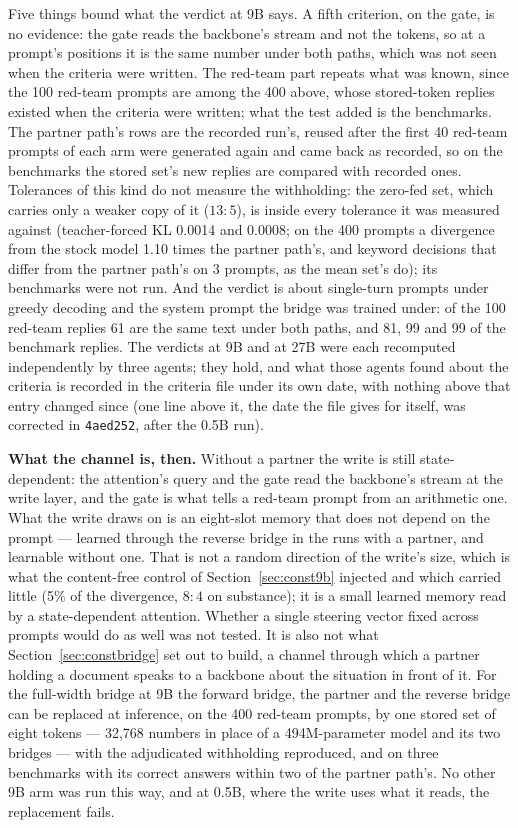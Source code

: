 \documentclass[11pt]{article}
\newcommand{\code}[1]{\texttt{#1}}
\begin{document}
Five things bound what the verdict at 9B says. A fifth criterion, on the gate, is
no evidence: the gate reads the backbone's stream and not the tokens, so at a
prompt's positions it is the same number under both paths, which was not seen when
the criteria were written. The red-team part repeats what was known, since the 100
red-team prompts are among the 400 above, whose stored-token replies existed when
the criteria were written; what the test added is the benchmarks. The partner
path's rows are the recorded run's, reused after the first 40 red-team prompts of
each arm were generated again and came back as recorded, so on the benchmarks the
stored set's new replies are compared with recorded ones. Tolerances of this kind
do not measure the withholding: the zero-fed set, which carries only a weaker copy
of it ($13{:}5$), is inside every tolerance it was measured against
(teacher-forced KL 0.0014 and 0.0008; on the 400 prompts a divergence from the
stock model 1.10 times the partner path's, and keyword decisions that differ from
the partner path's on 3 prompts, as the mean set's do); its benchmarks were not
run. And the verdict is about single-turn prompts under greedy decoding and the
system prompt the bridge was trained under: of the 100 red-team replies 61 are the
same text under both paths, and 81, 99 and 99 of the benchmark replies. The
verdicts at 9B and at 27B were each recomputed independently by three agents;
they hold, and what those agents found about the
criteria is recorded in the criteria file under its own date, with nothing above
that entry changed since (one line above it, the date the file gives for itself,
was corrected in \code{4aed252}, after the 0.5B run).

\textbf{What the channel is, then.} Without a partner the write is still
state-dependent: the attention's query and the gate read the backbone's stream at
the write layer, and the gate is what tells a red-team prompt from an arithmetic
one. What the write draws on is an eight-slot memory that does not depend on the
prompt --- learned through the reverse bridge in the runs with a partner, and
learnable without one. That is not a random direction of the write's size, which is
what the content-free control of Section~\ref{sec:const9b} injected and which
carried little (5\% of the divergence, $8{:}4$ on substance); it is a small learned
memory read by a state-dependent attention. Whether a single steering vector fixed
across prompts would do as well was not tested. It is
also not what Section~\ref{sec:constbridge} set out to build, a channel through
which a partner holding a document speaks to a backbone about the situation in
front of it. For the full-width bridge at 9B the forward bridge, the partner and
the reverse bridge can be replaced at inference, on the 400 red-team prompts, by one
stored set of eight tokens --- 32,768 numbers in place of a 494M-parameter model
and its two bridges --- with the adjudicated withholding reproduced, and on three
benchmarks with its correct answers within two of the partner path's. No other 9B
arm was run this way, and at 0.5B, where the write uses what it reads, the
replacement fails.
\end{document}
